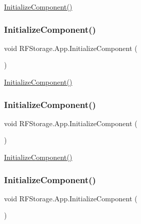 \mbox{\hyperlink{class_r_f_storage_1_1_app_aee12f2c565f216fc400227a9c9446954}{Initialize\+Component()}} 

\mbox{\label{class_r_f_storage_1_1_app_aee12f2c565f216fc400227a9c9446954}} 
\subsubsection{\texorpdfstring{InitializeComponent()}{InitializeComponent()}\hspace{0.1cm}{\footnotesize\ttfamily [4/8]}}
{\footnotesize\ttfamily void R\+F\+Storage.\+App.\+Initialize\+Component (\begin{DoxyParamCaption}{ }\end{DoxyParamCaption})}



\mbox{\hyperlink{class_r_f_storage_1_1_app_aee12f2c565f216fc400227a9c9446954}{Initialize\+Component()}} 

\mbox{\label{class_r_f_storage_1_1_app_aee12f2c565f216fc400227a9c9446954}} 
\subsubsection{\texorpdfstring{InitializeComponent()}{InitializeComponent()}\hspace{0.1cm}{\footnotesize\ttfamily [5/8]}}
{\footnotesize\ttfamily void R\+F\+Storage.\+App.\+Initialize\+Component (\begin{DoxyParamCaption}{ }\end{DoxyParamCaption})}



\mbox{\hyperlink{class_r_f_storage_1_1_app_aee12f2c565f216fc400227a9c9446954}{Initialize\+Component()}} 

\mbox{\label{class_r_f_storage_1_1_app_aee12f2c565f216fc400227a9c9446954}} 
\subsubsection{\texorpdfstring{InitializeComponent()}{InitializeComponent()}\hspace{0.1cm}{\footnotesize\ttfamily [6/8]}}
{\footnotesize\ttfamily void R\+F\+Storage.\+App.\+Initialize\+Component (\begin{DoxyParamCaption}{ }\end{DoxyParamCaption})}



